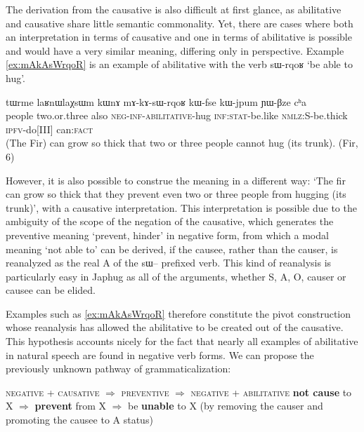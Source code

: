 \documentclass[oldfontcommands,oneside,a4paper,11pt]{article}
\newcommand{\ipa}[1]{{\phon \mbox{#1}}} %
\begin{document}
The derivation from the causative is also difficult at first glance, as abilitative and causative share little semantic commonality. Yet, there are cases where both an interpretation in terms of causative and one in terms of abilitative is possible and would have a very similar meaning, differing only in perspective. Example \ref{ex:mAkAsWrqoR} is an example of abilitative with the verb \ipa{sɯ-rqoʁ} `be able to hug'.


 \begin{exe}
\ex \label{ex:mAkAsWrqoR}
\gll
\ipa{tɯrme} 	\ipa{laʁnɯlaχsɯm} 	\ipa{kɯnɤ} 	\ipa{mɤ-kɤ-sɯ-rqoʁ} 	\ipa{kɯ-fse} 	\ipa{kɯ-jpum} 	\ipa{ɲɯ-βze} 	\ipa{cʰa} \\
people two.or.three also \textsc{neg-inf-abilitative}-hug \textsc{inf:stat}-be.like \textsc{nmlz:S}-be.thick \textsc{ipfv}-do[III] can\textsc{:fact} \\
\glt  (The Fir) can grow so thick that two or three people cannot hug (its trunk). (Fir, 6)
   \end{exe}

However, it is also possible to construe the meaning in a different way: `The fir can grow so thick that they prevent even two or three people from hugging (its trunk)', with a causative interpretation. This interpretation is possible due to the ambiguity of the scope of the negation of the causative, which generates the preventive meaning `prevent, hinder' in negative form, from which a modal meaning `not able to' can be derived, if the causee, rather than the causer, is reanalyzed as the real A of the \ipa{sɯ--} prefixed verb. This kind of reanalysis is particularly easy in Japhug as all of the arguments, whether S, A, O, causer or causee can be elided.

Examples such as \ref{ex:mAkAsWrqoR} therefore constitute the pivot construction whose reanalysis has allowed the abilitative to be created out of the causative. This hypothesis accounts nicely for the fact that nearly all examples of abilitative in natural speech are found in negative verb forms. We can propose the previously unknown pathway of grammaticalization:

{\small
\begin{exe}
\ex \label{ex:pathway2}
\glt \textsc{negative}   + \textsc{causative} $\Rightarrow$ \textsc{preventive} $\Rightarrow$ \textsc{negative} +  \textsc{abilitative} 
\glt \textbf{not cause} to X $\Rightarrow$ \textbf{prevent} from X $\Rightarrow$ be \textbf{unable} to X (by removing the causer and promoting the causee to A status)
\end{exe}
}
\end{document}
